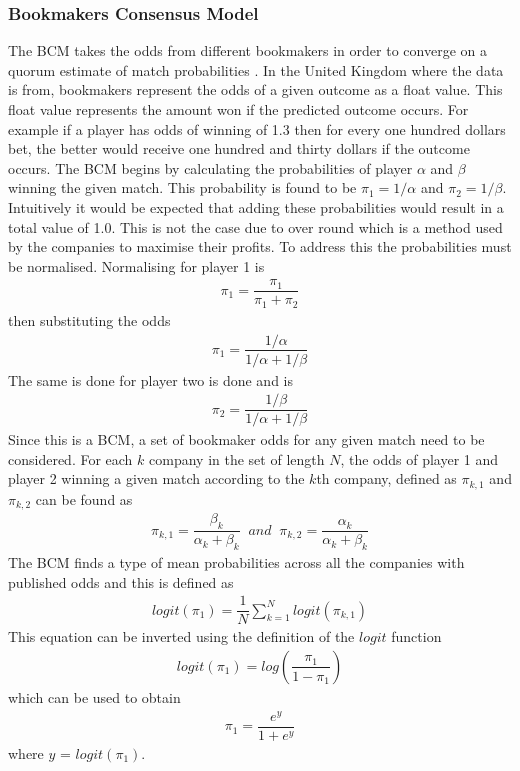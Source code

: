 \documentclass[12pt,a4paper]{article}
\begin{document}
\subsubsection{Bookmakers Consensus Model}
The BCM takes the odds from different bookmakers in order to
converge on a quorum estimate of match probabilities \cite{BCM}. In the United Kingdom where
the data is from, bookmakers represent the odds of a given outcome as a float value.
This float value represents the amount won if the predicted outcome occurs. For example if
a player has odds of winning of 1.3 then for every one hundred dollars bet, the better
would receive one hundred and thirty dollars if the outcome occurs. The BCM begins by calculating the probabilities of player $\alpha$ and $\beta$
winning the given match. This probability is found to be $\pi_1 = 1/\alpha$ and $\pi_2=1/\beta$.
Intuitively it would be expected that adding these probabilities would result in a
total value of 1.0. This is not the case due to over round which is a method used
by the companies to maximise their profits. To address this the probabilities must be
normalised. Normalising for player 1 is
\begin{gather}
  \pi_1 = \dfrac{\pi_1}{\pi_1+\pi_2}
\end{gather}
then substituting the odds
\begin{gather}
  \pi_1 = \dfrac{1/\alpha}{1/\alpha+1/\beta}
\end{gather}
The same is done for player two is done and is
\begin{gather}
  \pi_2 = \dfrac{1/\beta}{1/\alpha+1/\beta}
\end{gather}
Since this is a BCM, a set of bookmaker odds for any given match
need to be considered. For each $k$ company in the set of length $N$, the odds of player 1 and player 2
winning a given match according to the $k$th company, defined as $\pi_{k,1}$ and $\pi_{k,2}$
can be found as
\begin{gather}
  \pi_{k,1} = \dfrac{\beta_k}{\alpha_k+\beta_k}\;\;and\;\;\pi_{k,2} = \dfrac{\alpha_k}{\alpha_k+\beta_k}
\end{gather}
The BCM finds a type of mean probabilities across all the companies with published odds
and this is defined as
\begin{gather}
  logit(\pi_1) = \dfrac{1}{N}\sum_{k=1}^{N}logit(\pi_{k,1})
\end{gather}
This equation can be inverted using the definition of the $logit$ function
\begin{gather}
  logit(\pi_1) = log(\dfrac{\pi_1}{1-\pi_1})
\end{gather}
which can be used to obtain
\begin{gather}
  \pi_1 = \dfrac{e^y}{1+e^y}
\end{gather}
where $y$ = $logit(\pi_1)$.
\end{document}
